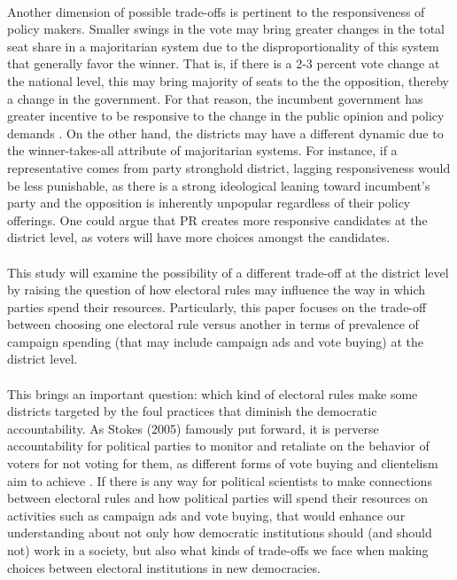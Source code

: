 \documentclass{article}
\begin{document}
\\
Another dimension of possible trade-offs is pertinent to the responsiveness of policy makers. Smaller swings in the vote may bring greater changes in the total seat share in a majoritarian system due to the disproportionality of this system that generally favor the winner. That is, if there is a 2-3 percent vote change at the national level, this may bring majority of seats to the the opposition, thereby a change in the government. For that reason, the incumbent government has greater incentive to be responsive to the change in the public opinion and policy demands \cite{norris1997choosing}. On the other hand, the districts may have a different dynamic due to the winner-takes-all attribute of majoritarian systems. For instance, if a representative comes from party stronghold district, lagging responsiveness would be less punishable, as there is a strong ideological leaning toward incumbent's party and the opposition is inherently unpopular regardless of their policy offerings. One could argue that PR creates more responsive candidates at the district level, as voters will have more choices amongst the candidates.\\
\\
This study will examine the possibility of a different trade-off at the district level by raising the question of how electoral rules may influence the way in which parties spend their resources. Particularly, this paper focuses on the trade-off between choosing one electoral rule versus another in terms of prevalence of campaign spending (that may include campaign ads and vote buying) at the district level.\\
\\
This brings an important question: which kind of electoral rules make some districts targeted by the foul practices that diminish the democratic accountability. As Stokes (2005) famously put forward, it is perverse accountability for political parties to monitor and retaliate on the behavior of voters for not voting for them, as different forms of vote buying and clientelism aim to achieve \cite{stokes_perverse_2005}. If there is any way for political scientists to make connections between electoral rules and how political parties will spend their resources on activities such as campaign ads and vote buying, that would enhance our understanding about not only how democratic institutions should (and should not) work in a society, but also what kinds of trade-offs we face when making choices between electoral institutions in new democracies.\\
\end{document}
